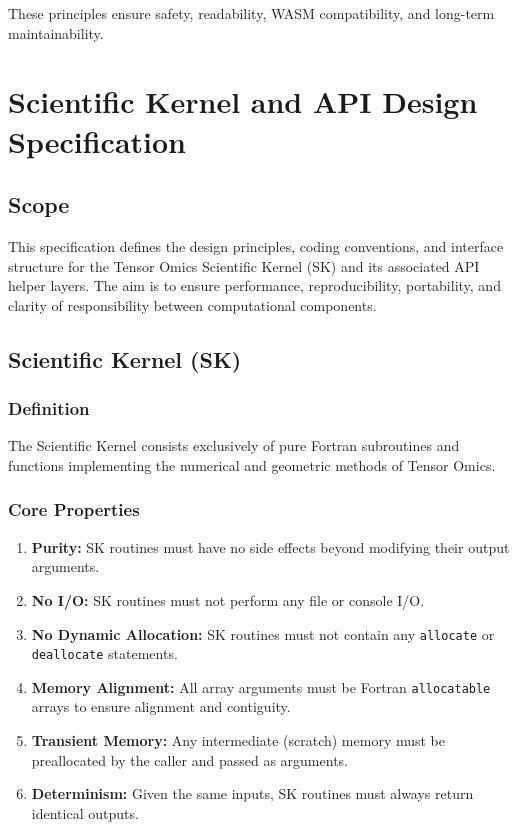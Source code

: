 \documentclass{article}
\begin{document}
These principles ensure safety, readability, WASM compatibility, and long-term maintainability.

\section{Scientific Kernel and API Design Specification}

\subsection{Scope}
This specification defines the design principles, coding conventions, and interface structure for the Tensor Omics Scientific Kernel (SK) and its associated API helper layers. The aim is to ensure performance, reproducibility, portability, and clarity of responsibility between computational components.

\subsection{Scientific Kernel (SK)}

\subsubsection{Definition}
The Scientific Kernel consists exclusively of pure Fortran subroutines and functions implementing the numerical and geometric methods of Tensor Omics.

\subsubsection{Core Properties}
\begin{enumerate}
  \item \textbf{Purity:} SK routines must have no side effects beyond modifying their output arguments.
  \item \textbf{No I/O:} SK routines must not perform any file or console I/O.
  \item \textbf{No Dynamic Allocation:} SK routines must not contain any \texttt{allocate} or \texttt{deallocate} statements.
  \item \textbf{Memory Alignment:} All array arguments must be Fortran \texttt{allocatable} arrays to ensure alignment and contiguity.
  \item \textbf{Transient Memory:} Any intermediate (scratch) memory must be preallocated by the caller and passed as arguments.
  \item \textbf{Determinism:} Given the same inputs, SK routines must always return identical outputs.
\end{enumerate}
\end{document}
